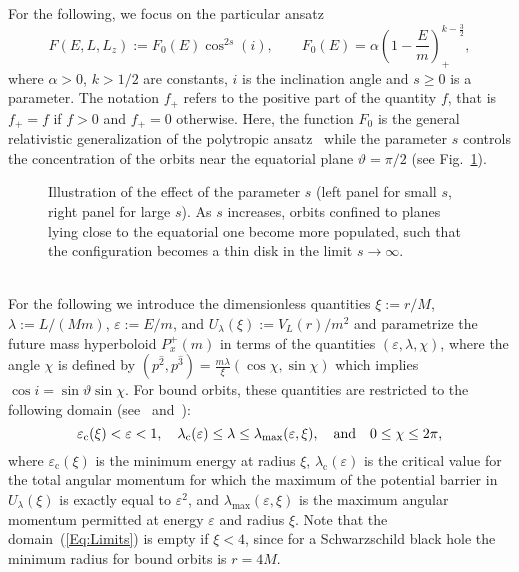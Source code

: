 \documentclass{appolb}
\begin{document}
For the following, we focus on the particular ansatz
\begin{equation}
\label{Eq:OneParticleDistrFunct}
F(E,L,L_z) := F_0(E) \cos^{2s}(i),\qquad
F_0(E) = \alpha \left(1 - \frac{E}{m} \right)_+^{k-\frac{3}{2}},
\end{equation}
where $\alpha > 0$, $k > 1/2$ are constants, $i$ is the inclination angle and $s\geq 0$ is a parameter. The notation $f_+$ refers to the positive part of the quantity $f$, that is $f_+ = f$ if $f > 0$ and $f_+ = 0$ otherwise. Here, the function $F_0$ is the general relativistic generalization of the polytropic ansatz~\cite{BT} while the parameter $s$ controls the concentration of the orbits near the equatorial plane $\vartheta = \pi/2$ (see Fig.~\ref{Fig:InclinationAngle}).
\begin{figure}[htb]
\centerline{
} 
\caption{Illustration of the effect of the parameter $s$ (left panel for small $s$, right panel for large $s$). As $s$ increases, orbits confined to planes lying close to the equatorial one become more populated, such that the configuration becomes a thin disk in the limit $s\to \infty$.}
\label{Fig:InclinationAngle}
\end{figure}\\
For the following we introduce the dimensionless quantities $\xi := r/M$, $\lambda := L/(M m)$, $\varepsilon := E/m$, and $U_\lambda(\xi) := V_L(r)/m^2$ and parametrize the future mass hyperboloid $P_x^+(m)$ in terms of the quantities $(\varepsilon,\lambda,\chi)$, where the angle $\chi$ is defined by $(p^{\hat{2}},p^{\hat{3}}) = \frac{m\lambda}{\xi}(\cos\chi,\sin\chi)$ which implies $\cos i = \sin\vartheta \sin\chi$. For bound orbits, these quantities are restricted to the following domain (see~\cite[Appendix A]{pRoS16} and~\cite[Appendix A]{cGoS2021b}):
\begin{equation}
\label{Eq:Limits}
\varepsilon_{\text{c}}(\xi) < \varepsilon < 1, \quad \lambda_{\text{c}}(\varepsilon) \leq \lambda \leq \lambda_{\text{max}}(\varepsilon,\xi), \quad \hbox{and} \quad 0\leq \chi \leq 2\pi,
\end{equation}
where $\varepsilon_{\text{c}}(\xi)$ is the minimum energy at radius $\xi$, $\lambda_{\text{c}}(\varepsilon)$ is the critical value for the total angular momentum for which the maximum of the potential barrier in $U_\lambda(\xi)$ is exactly equal to $\varepsilon^2$, and $\lambda_{\text{max}}(\varepsilon,\xi)$ is the maximum angular momentum permitted at energy $\varepsilon$ and radius $\xi$. Note that the domain~(\ref{Eq:Limits}) is empty if $\xi < 4$, since for a Schwarzschild black hole the minimum radius for bound orbits is $r = 4M$.
\end{document}
